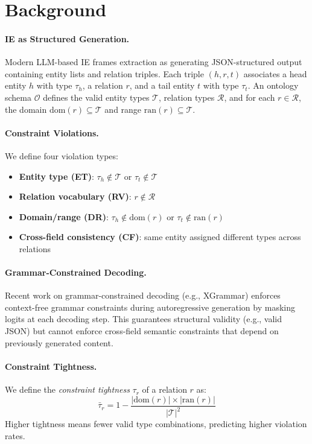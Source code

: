 \documentclass[11pt,a4paper]{article}
\begin{document}
\section{Background}
\label{sec:background}

\paragraph{IE as Structured Generation.} Modern LLM-based IE frames extraction as generating JSON-structured output containing entity lists and relation triples. Each triple $(h, r, t)$ associates a head entity $h$ with type $\tau_h$, a relation $r$, and a tail entity $t$ with type $\tau_t$. An ontology schema $\mathcal{O}$ defines the valid entity types $\mathcal{T}$, relation types $\mathcal{R}$, and for each $r \in \mathcal{R}$, the domain $\text{dom}(r) \subseteq \mathcal{T}$ and range $\text{ran}(r) \subseteq \mathcal{T}$.

\paragraph{Constraint Violations.} We define four violation types:
\begin{itemize}
\item \textbf{Entity type (ET)}: $\tau_h \notin \mathcal{T}$ or $\tau_t \notin \mathcal{T}$
\item \textbf{Relation vocabulary (RV)}: $r \notin \mathcal{R}$
\item \textbf{Domain/range (DR)}: $\tau_h \notin \text{dom}(r)$ or $\tau_t \notin \text{ran}(r)$
\item \textbf{Cross-field consistency (CF)}: same entity assigned different types across relations
\end{itemize}

\paragraph{Grammar-Constrained Decoding.} Recent work on grammar-constrained decoding (e.g., XGrammar) enforces context-free grammar constraints during autoregressive generation by masking logits at each decoding step. This guarantees structural validity (e.g., valid JSON) but cannot enforce cross-field semantic constraints that depend on previously generated content.

\paragraph{Constraint Tightness.} We define the \emph{constraint tightness} $\tau_r$ of a relation $r$ as:
\begin{equation}
\bar{\tau}_r = 1 - \frac{|\text{dom}(r)| \times |\text{ran}(r)|}{|\mathcal{T}|^2}
\end{equation}
Higher tightness means fewer valid type combinations, predicting higher violation rates.
\end{document}
